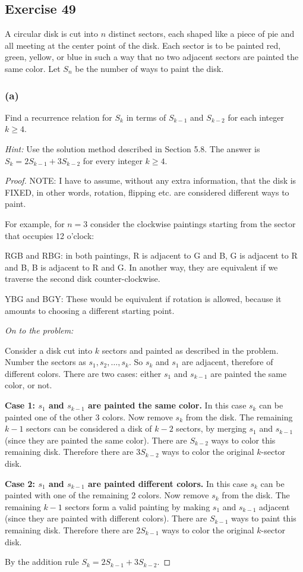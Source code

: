 \documentclass[14pt]{extarticle}
\begin{document}
\subsection{Exercise 49}
A circular disk is cut into $n$ distinct sectors, each shaped like a piece of pie and all meeting at the center 
point of the disk. Each sector is to be painted red, green, yellow, or blue in such a way that no two adjacent sectors 
are painted the same color. Let \(S_n\) be the number of ways to paint the disk.

\subsubsection{(a)}
Find a recurrence relation for \(S_k\) in terms of \(S_{k-1}\) and \(S_{k-2}\) for each integer \(k \geq 4\).

{\it Hint:} Use the solution method described in Section 5.8. The answer is \(S_k = 2S_{k-1} + 3S_{k-2}\) for every 
integer \(k \geq 4\).

\begin{proof}
NOTE: I have to assume, without any extra information, that the disk is FIXED, in other words, rotation, flipping etc.
are considered different ways to paint.

For example, for \(n=3\) consider the clockwise paintings starting from the sector that occupies 12 o'clock: 

RGB and RBG: in both paintings, R is adjacent to G and B, G is adjacent to R and B, B is adjacent to R and G. In 
another way, they are equivalent if we traverse the second disk counter-clockwise.

YBG and BGY: These would be equivalent if rotation is allowed, because it amounts to choosing a different starting point.

{\it On to the problem:}

Consider a disk cut into \(k\) sectors and painted as described in the problem. Number the sectors as \(s_1, s_2, 
\ldots, s_k\). So \(s_k\) and \(s_1\) are adjacent, therefore of different colors. There are two cases: either 
\(s_1\) and \(s_{k-1}\) are painted the same color, or not.

{\bf Case 1: \(s_1\) and \(s_{k-1}\) are painted the same color.} In this case \(s_k\) can be painted one of the 
other 3 colors. Now remove \(s_k\) from the disk. The remaining \(k-1\) sectors can be considered a disk of 
\(k-2\) sectors, by merging \(s_1\) and \(s_{k-1}\) (since they are painted the same color). There are \(S_{k-2}\) 
ways to color this remaining disk. Therefore there are \(3S_{k-2}\) ways to color the original \(k\)-sector disk.

{\bf Case 2: \(s_1\) and \(s_{k-1}\) are painted different colors.} In this case \(s_k\) can be painted with one of 
the remaining 2 colors. Now remove \(s_k\) from the disk. The remaining \(k-1\) sectors form a valid painting by 
making \(s_1\) and \(s_{k-1}\) adjacent (since they are painted with different colors). There are \(S_{k-1}\) ways 
to paint this remaining disk. Therefore there are \(2S_{k-1}\) ways to color the original \(k\)-sector disk.

By the addition rule \(S_k = 2S_{k-1} + 3S_{k-2}\).
\end{proof}
\end{document}
